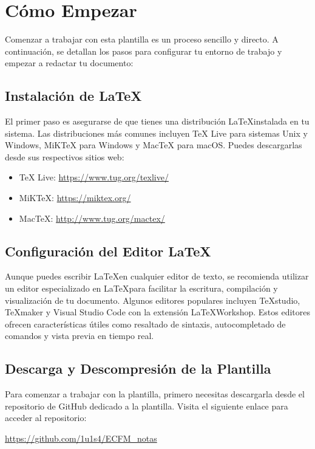 \documentclass[11pt]{article}
\begin{document}
\section{Cómo Empezar}
Comenzar a trabajar con esta plantilla es un proceso sencillo y directo. A continuación, se detallan los pasos para configurar tu entorno de trabajo y empezar a redactar tu documento:

\subsection{Instalación de \LaTeX}

El primer paso es asegurarse de que tienes una distribución \LaTeX instalada en tu sistema. Las distribuciones más comunes incluyen TeX Live para sistemas Unix y Windows, MiKTeX para Windows y MacTeX para macOS. Puedes descargarlas desde sus respectivos sitios web:

\begin{itemize}
\item TeX Live: \url{https://www.tug.org/texlive/}
\item MiKTeX: \url{https://miktex.org/}
\item MacTeX: \url{http://www.tug.org/mactex/}
\end{itemize}

\subsection{Configuración del Editor \LaTeX}

Aunque puedes escribir \LaTeX en cualquier editor de texto, se recomienda utilizar un editor especializado en \LaTeX para facilitar la escritura, compilación y visualización de tu documento. Algunos editores populares incluyen TeXstudio, TeXmaker y Visual Studio Code con la extensión \LaTeX Workshop. Estos editores ofrecen características útiles como resaltado de sintaxis, autocompletado de comandos y vista previa en tiempo real.

\subsection{Descarga y Descompresión de la Plantilla}

Para comenzar a trabajar con la plantilla, primero necesitas descargarla desde el repositorio de GitHub dedicado a la plantilla. Visita el siguiente enlace para acceder al repositorio:

\begin{center}
\url{https://github.com/1u1s4/ECFM_notas}
\end{center}
\end{document}
